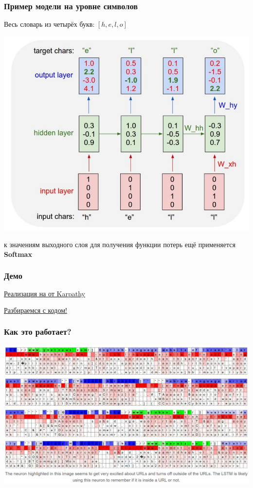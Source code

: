 \documentclass[fullscreen=true, bookmarks=true, hyperref={pdfencoding=unicode}]{beamer}
\begin{document}
\begin{frame}
  \frametitle{Пример модели на уровне символов}

   Весь словарь из четырёх букв: $[h, e, l, o]$

   \begin{center}
     \includegraphics[keepaspectratio,
                      width=0.6\paperwidth]{rnn_char_level_example.jpg}
   \end{center}

   к значениям выходного слоя для получения функции потерь ещё применяется {\bf Softmax}

\end{frame}


\begin{frame}
  \frametitle{Демо}

  \href{https://gist.github.com/karpathy/d4dee566867f8291f086}{Реализация на  от Karpathy}

  \vspace{1cm}
  \href{https://github.com/spbu-math-cs/ml-course/blob/main/2022-spring-part-2/lectures/03_rnn/03_rnn_demo.ipynb}{Разбираемся с кодом!}
\end{frame}


\begin{frame}
  \frametitle{Как это работает?}

  \includegraphics[keepaspectratio,
                   width=.85\paperwidth]{url_neuron.png}

\end{frame}
\end{document}
